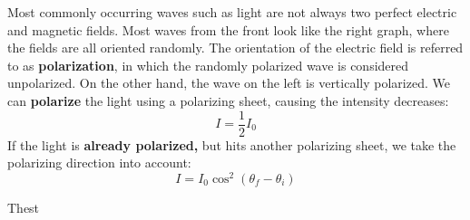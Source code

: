\documentclass[11pt]{article}
\begin{document}
\begin{figure}[H]
\begin{minipage}{0.66\textwidth}
\begin{tikzpicture}[x=(-15:1.2), y=(90:1.0), z=(-150:1.0),
                line cap=round, line join=round,
                axis/.style={black, thick,->},
                vector/.style={>=stealth,->}]
            \end{tikzpicture}
        \end{minipage}%
        \begin{minipage}{0.43\textwidth}
            \centering
        \end{minipage}
    \end{figure}
    \noindent Most commonly occurring waves such as light are not always two perfect electric and magnetic fields.
    Most waves from the front look like the right graph, where the fields are all oriented randomly.
    The orientation of the electric field is referred to as \textbf{polarization},
    in which the randomly polarized wave is considered unpolarized.
    On the other hand, the wave on the left is vertically polarized.
    We can \textbf{polarize} the light using a polarizing sheet, causing the intensity decreases:
    \begin{equation}
        I = \frac{1}{2} I_0 \tag{one-half rule}
        \end{equation}
    If the light is \textbf{already polarized,} but hits another polarizing sheet,
    we take the polarizing direction into account:
    \begin{equation}
        I = I_0 \cos^2(\theta_f - \theta_i ) \tag{cosine-squared rule}
    \end{equation}

Thest
\end{document}
